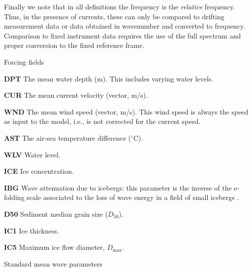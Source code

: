 Finally we note that in all definitions the frequency is the \emph{relative} frequency. Thus, in the presence of currents, these can only be compared to drifting measurement data or data obtained in wavenumber and converted to frequency. Comparison to fixed instrument data requires the use of the full spectrum and proper conversion to the fixed reference frame.

\begin{list}{)\hfill}
            { \leftmargin 7mm 
             \rightmargin 0mm \itemsep \baselineskip \parsep 0mm}

\item {Forcing fields}

\begin{list}{)\hfill}
            { \leftmargin 8mm 
             \rightmargin 0mm \itemsep 0mm \parsep 0mm}
\item \textbf{DPT} The mean water depth (m). This includes varying water levels. 
\item \textbf{CUR} The mean current velocity (vector, m/s).
\item \textbf{WND} The mean wind speed (vector, m/s). This wind speed is always the
      speed as input to the model, i.e., is not corrected for the current
      speed.
\item \textbf{AST} The air-sea temperature difference ($^\circ$C).
\item \textbf{WLV} Water level.
\item \textbf{ICE} Ice concentration.
\item \textbf{IBG} Wave attenuation due to icebergs: this parameter is the inverse of the
  e-folding scale associated to the loss of wave energy in a field of small
  icebergs \citep{art:Aea11}.
\item \textbf{D50} Sediment median grain size ($D_{50}$). 
\item \textbf{IC1} Ice thickness. 
\item \textbf{IC5} Maximum ice flow diameter, $D_{\max}$. 
\end{list}

\item{Standard mean wave parameters}


\end{list}

